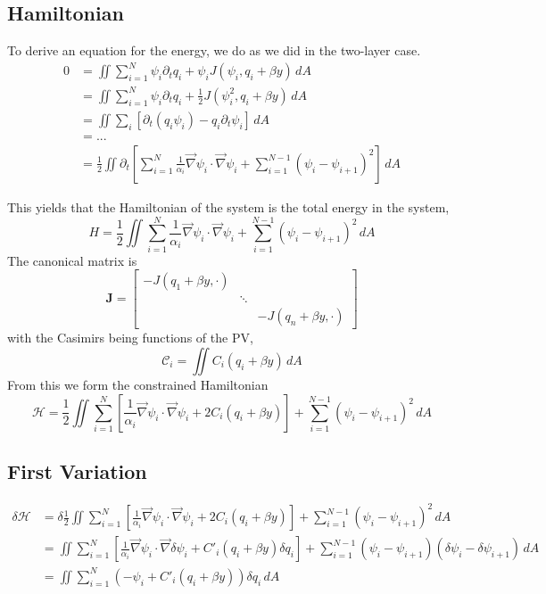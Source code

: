 \documentclass[12pt]{article}
\begin{document}
{    \subsection{Hamiltonian}{
        To derive an equation for the energy, we do as we did in the two-layer case.
        \begin{align*}
        0 &= \iint \sum_{i=1}^N \psi_i \partial_t q_i + \psi_i J(\psi_i, q_i + \beta y) \, dA \\
        &= \iint \sum_{i=1}^N \psi_i \partial_t q_i + \frac12 J(\psi_i^2, q_i + \beta y) \, dA \\
        &= \iint \sum_i \left[\partial_t(q_i \psi_i) - q_i \partial_t\psi_i \right] \, dA \\
        &= ... \\
        &= \frac12 \iint \partial_t \left[ \sum_{i=1}^N \frac{1}{\alpha_i} \vec\nabla \psi_i \cdot \vec\nabla \psi_i + \sum_{i=1}^{N-1} (\psi_i - \psi_{i+1})^2 \right]\, dA
        \end{align*}

        This yields that the Hamiltonian of the system is the total energy in the system,
        $$
        H = \frac12 \iint \sum_{i=1}^N \frac{1}{\alpha_i}\vec\nabla \psi_i \cdot \vec\nabla \psi_i + \sum_{i=1}^{N-1} (\psi_i - \psi_{i+1})^2 \, dA
        $$
        The canonical matrix is
        $$
        \mathbf{J} = \left[\begin{array}{ccc}
        -J(q_1 + \beta y, \cdot) & & \\
        & \ddots & \\
        & & -J(q_n + \beta y, \cdot)
        \end{array}\right]
        $$
        with the Casimirs being functions of the PV,
        $$
        \mathcal{C}_i = \iint C_i(q_i + \beta y) \, dA
        $$
        From this we form the constrained Hamiltonian
        \begin{equation}
        \mathcal{H} = \frac12 \iint \sum_{i=1}^N \left[ \frac{1}{\alpha_i} \vec\nabla \psi_i \cdot \vec\nabla \psi_i + 2C_i(q_i + \beta y) \right] + \sum_{i=1}^{N-1} (\psi_i - \psi_{i+1})^2 \, dA
        \label{eqn:qg_Nl_h}
        \end{equation}
    }

    \subsection{First Variation}{
        \begin{align*}
        \delta \mathcal{H} &= \delta\frac12 \iint \sum_{i=1}^N \left[ \frac{1}{\alpha_i} \vec\nabla \psi_i \cdot \vec\nabla \psi_i + 2C_i(q_i + \beta y) \right] + \sum_{i=1}^{N-1} (\psi_i - \psi_{i+1})^2 \, dA \\
        &= \iint \sum_{i=1}^N \left[ \frac{1}{\alpha_i} \vec\nabla \psi_i \cdot \vec\nabla \delta\psi_i + C'_i(q_i + \beta y) \delta q_i \right]+ \sum_{i=1}^{N-1} (\psi_i - \psi_{i+1})(\delta \psi_i - \delta \psi_{i+1}) \, dA \\
        &= \iint \sum_{i=1}^N (-\psi_i + C'_i(q_i + \beta y)) \delta q_i\, dA \\
        \end{align*}

}}
\end{document}
